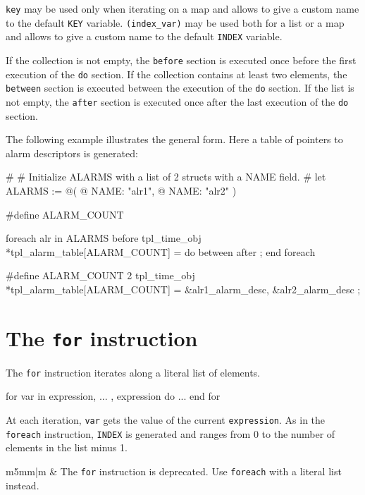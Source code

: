 \documentclass[10pt,openright,twosides]{report}
\newcommand{\icst}[1]{{\footnotesize\ttfamily\colorbox{light-blue}{#1}}}
\newcommand{\gtlinline}[1]{\colorbox{light-blue}{\lstinline[language=gtl]{#1}}}
\newcommand\Warning{%
 \makebox[1.4em][c]{%
 \makebox[0pt][c]{\raisebox{-.05em}{\scriptsize!}}%
 \makebox[0pt][c]{\raisebox{-.2em}{\color{red}\Large$\bigtriangleup$}}}}%
\newcommand{\warning}[1]{%
\vspace{1em}
\hspace{-18.3mm}
\rowcolors{1}{white}{light-gray}
\begin{tabular}[b]{m{5mm}|m{\linewidth}}
\Warning & #1\\
\end{tabular}
}
\begin{document}
\gtlinline{key} may be used only when iterating on a map and allows to give a custom name to the default \gtlinline{KEY} variable. \gtlinline{(index_var)} may be used both for a list or a map and allows to give a custom name to the default \gtlinline{INDEX} variable.

If the collection is not empty, the \gtlinline{before} section is executed once before the first execution of the \gtlinline{do} section. If the collection contains at least two elements, the \gtlinline{between} section is executed between the execution of the \gtlinline{do} section.  If the list is not empty, the \gtlinline{after} section is executed once after the last execution of the \gtlinline{do} section.

The following example illustrates the general form. Here a table of pointers to alarm descriptors is generated:

\begin{gtl}
#
# Initialize ALARMS with a list of 2 structs with a NAME field.
#
let ALARMS := @( @{ NAME: "alr1"}, @{ NAME: "alr2"} )

%
#define ALARM_COUNT %

foreach alr in ALARMS
  before %
tpl_time_obj *tpl_alarm_table[ALARM_COUNT] = {
%
  do %
  between %
%
  after %
};
%
end foreach
\end{gtl}
\begin{templateoutput}
#define ALARM_COUNT 2
tpl_time_obj *tpl_alarm_table[ALARM_COUNT] = {
  &alr1_alarm_desc,
  &alr2_alarm_desc
};
\end{templateoutput}

%
%
\section{The \texttt{for} instruction}

The \gtlinline{for} instruction iterates along a literal list of elements.

\begin{gtl}
for var in expression, ... , expression do
  ...
end for
\end{gtl}

At each iteration, \gtlinline{var} gets the value of the current \gtlinline{expression}. As in the \gtlinline{foreach} instruction, \gtlinline{INDEX} is generated and ranges from \icst{0} to the number of elements in the list minus 1.

\warning{The \gtlinline{for} instruction is deprecated. Use \gtlinline{foreach} with a literal list instead.}
\end{document}
